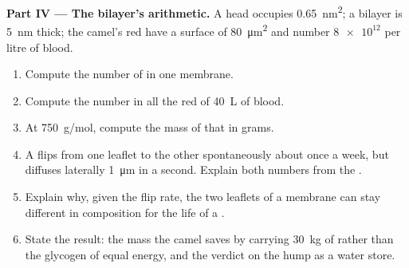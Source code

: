 \begin{problem}
\medskip
\noindent\textbf{Part IV --- The bilayer's arithmetic.}
A  head occupies \qty{0.65}{nm^2}; a bilayer is
\qty{5}{nm} thick; the camel's red  have a surface of
\qty{80}{\micro m^2} and number $\num{8e12}$ per litre of blood.
\begin{enumerate}[resume]
  \item Compute the number of  in one  membrane.
  \item Compute the number in all the red  of \qty{40}{L} of blood.
  \item At \qty{750}{g/mol}, compute the mass of that  in grams.
  \item A  flips from one leaflet to the other
        spontaneously about once a week, but diffuses laterally
        \qty{1}{\micro m} in a second. Explain both numbers from the
        .
  \item Explain why, given the flip rate, the two leaflets of a
        membrane can stay different in composition for the life of a
        .
  \item State the result: the mass the camel saves by carrying
        \qty{30}{kg} of  rather than the glycogen of equal energy,
        and the verdict on the hump as a water store.
\end{enumerate}
\end{problem}
